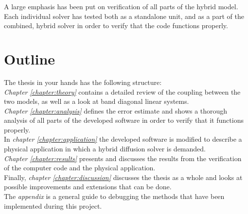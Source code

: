 \noindent A large emphasis has been put on verification of all parts of the hybrid model. 
Each individual solver has tested both as a standalone unit, and as a part of the combined, hybrid solver in order to verify that the code functions properly.

\section{Outline}
\noindent The thesis in your hands has the following structure: \\

\noindent \emph{Chapter \ref{chapter:theory}} contains a detailed review of the coupling between the two models, as well as a look at band diagonal linear systems. \\

\noindent \emph{Chapter \ref{chapter:analysis}} defines the error estimate and shows a thorough analysis of all parts of the developed software in order to verify that it functions properly. \\

\noindent In \emph{chapter \ref{chapter:application}} the developed software is modified to describe a physical application in which a hybrid diffusion solver is demanded. \\

\noindent \emph{Chapter \ref{chapter:results}} presents and discusses the results from the verification of the computer code and the physical application. \\

\noindent Finally, \emph{chapter \ref{chapter:discussion}} discusses the thesis as a whole and looks at possible improvements and extensions that can be done. \\

\noindent The \emph{appendix} is a general guide to debugging the methods that have been implemented during this project.